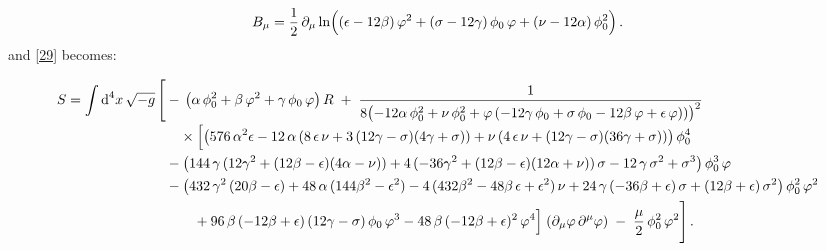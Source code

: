 \documentclass[aps,prd,reprint,preprintnumbers,showpacs,floatfix,nofootinbib,superscript address]{revtex4-2}
\begin{document}
\begin{equation}\label{30}
B_\mu = \frac{1}{2}\,\partial_\mu \ln\Bigl((\epsilon-12\beta)\,\varphi^2 + (\sigma-12\gamma)\,\phi_0\,\varphi + (\nu-12\alpha)\,\phi_0^2\Bigr)\,.
\end{equation}
and \cref{29} becomes:
\begin{widetext}
\begin{subequations}
\begin{align}  \label{42a}
S = \int \text{d}^4x\,\sqrt{-g}\,\Biggl[ 
  &-\,\bigl(\alpha\,\phi_0^2 + \beta\,\varphi^2 + \gamma\,\phi_0\,\varphi\bigr)\,R
  \;+\;
    \frac{1}{8\bigl(-12\alpha\,\phi_0^2 + \nu\,\phi_0^2 
      + \varphi\,(-12\gamma\,\phi_0 + \sigma\,\phi_0 - 12\beta\,\varphi + \epsilon\,\varphi))\bigr)^2}
    \nonumber\\[-0.5ex]
  &\quad\times
    \Bigl[
      \bigl(576\,\alpha^2\epsilon 
        -12\,\alpha\,(8\,\epsilon\,\nu + 3\,(12\gamma - \sigma)(4\gamma + \sigma))
        + \nu\,(4\,\epsilon\,\nu + (12\gamma - \sigma)(36\gamma + \sigma))
      \bigr)\,\phi_0^4 
    \nonumber\\
  &
    -\bigl(
      144\,\gamma\,(12\gamma^2 + (12\beta - \epsilon)(4\alpha - \nu))
      +4\,(-36\gamma^2 + (12\beta - \epsilon)(12\alpha + \nu))\,\sigma
      -12\,\gamma\,\sigma^2
      +\sigma^3
    \bigr)\,\phi_0^3\,\varphi
    \nonumber\\
  &
    -\bigl(
      432\,\gamma^2\,(20\beta - \epsilon)
      +48\,\alpha\,(144\beta^2 - \epsilon^2)
      -4\,(432\beta^2 - 48\beta\,\epsilon + \epsilon^2)\,\nu
      +24\,\gamma\,(-36\beta + \epsilon)\,\sigma
      +(12\beta + \epsilon)\,\sigma^2
    \bigr)\,\phi_0^2\,\varphi^2
    \nonumber\\
  &\quad\quad
    +96\,\beta\,(-12\beta + \epsilon)\,(12\gamma - \sigma)\,\phi_0\,\varphi^3
    -48\,\beta\,(-12\beta + \epsilon)^2\,\varphi^4
    \Bigr]
    \;(\partial_{\mu}\varphi\,\partial^{\mu}\varphi)
  \;-\;\frac{\mu}{2}\,\phi_0^2\,\varphi^2
\Biggr]\,.
\end{align}
\end{subequations}
\end{widetext}
\end{document}
